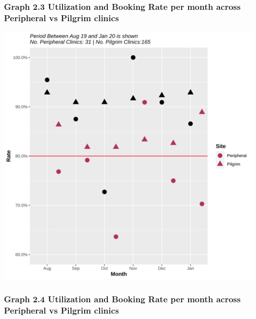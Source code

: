 \documentclass[]{article}
\begin{document}
\hypertarget{graph-2.3-utilization-and-booking-rate-per-month-across-peripheral-vs-pilgrim-clinics}{%
\subsubsection{Graph 2.3 Utilization and Booking Rate per month across
Peripheral vs Pilgrim
clinics}\label{graph-2.3-utilization-and-booking-rate-per-month-across-peripheral-vs-pilgrim-clinics}}

\begin{center}\includegraphics{LF2_files/figure-latex/unnamed-chunk-8-1} \end{center}

\hypertarget{graph-2.4-utilization-and-booking-rate-per-month-across-peripheral-vs-pilgrim-clinics}{%
\subsubsection{Graph 2.4 Utilization and Booking Rate per month across
Peripheral vs Pilgrim
clinics}\label{graph-2.4-utilization-and-booking-rate-per-month-across-peripheral-vs-pilgrim-clinics}}
\end{document}
